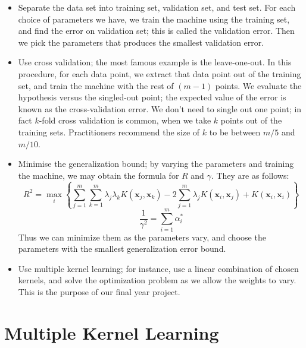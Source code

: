 \documentclass[11pt]{article}%
\def\bs{\boldsymbol}
\begin{document}
\begin{itemize}
\item Separate the data set into training set, validation set, and test set. For each choice of parameters we have, we train the machine using the training set, and find the error on validation set; this is called the validation error. Then we pick the parameters that produces the smallest validation error.
\item Use cross validation; the most famous example is the leave-one-out. In this procedure, for each data point, we extract that data point out of the training set, and train the machine with the rest of $(m-1)$ points. We evaluate the hypothesis versus the singled-out point; the expected value of the error is known as the cross-validation error. We don't need to single out one point; in fact $k$-fold cross validation is common, when we take $k$ points out of the training sets. Practitioners recommend the size of $k$ to be between $m/5$ and $m/10$.
\item Minimise the generalization bound; by varying the parameters and training the machine, we may obtain the formula for $R$ and $\gamma$. They are as follows:
\[R^2 = \max_i\left\{\sum_{j=1}^m\sum_{k=1}^m \lambda_j\lambda_kK(\bs x_j, \bs x_k) - 2\sum_{j=1}^m\lambda_jK(\bs x_i, \bs x_j)+K(\bs x_i,\bs x_i)\right\}\]
\[\frac{1}{\gamma^2}=\sum_{i=1}^m\alpha_i^*\]
Thus we can minimize them as the parameters vary, and choose the parameters with the smallest generalization error bound.
\item Use multiple kernel learning; for instance, use a linear combination of chosen kernels, and solve the optimization problem as we allow the weights to vary. This is the purpose of our final year project.
\end{itemize}

\section{Multiple Kernel Learning}
\end{document}
